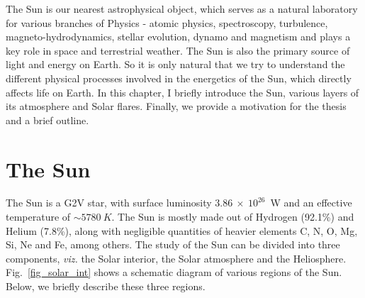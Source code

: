 \justifying

The Sun is our nearest astrophysical object, which serves as a natural laboratory for various branches of Physics - atomic physics, spectroscopy, turbulence, magneto-hydrodynamics, stellar evolution, dynamo and magnetism and plays a key role in space and terrestrial weather. The Sun is also the primary source of light and energy on Earth. So it is only natural that we try to understand the different physical processes involved in the energetics of the Sun, which directly affects life on Earth. In this chapter, I briefly introduce the Sun, various layers of its atmosphere and Solar flares. Finally, we provide a motivation for the thesis and a brief outline.

\section{The Sun}\label{Sun}

The Sun is a G2V star, with surface luminosity $3.86~\times~10^{26}$~W and an effective temperature of $\sim 5780~K$. The Sun is mostly made out of Hydrogen (92.1\%) and Helium (7.8\%), along with negligible quantities of heavier elements C, N, O, Mg, Si, Ne and Fe, among others. The study of the Sun can be divided into three components, \textit{viz.} the Solar interior, the Solar atmosphere and the Heliosphere. Fig.~\ref{fig_solar_int} shows a schematic diagram of various regions of the Sun. Below, we briefly describe these three regions.


